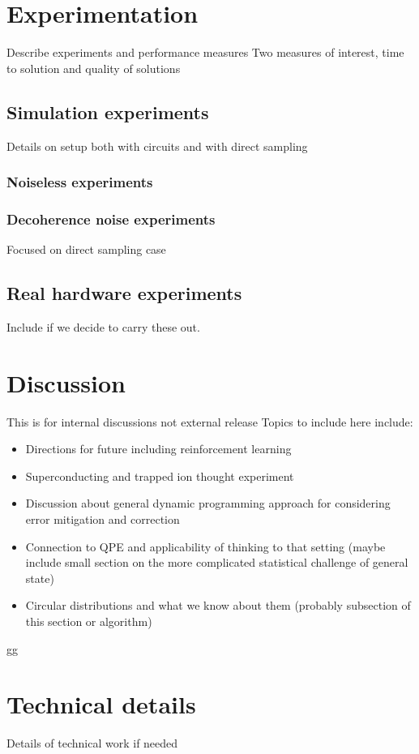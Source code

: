\documentclass[a4paper,onecolumn,11pt,unpublished]{quantumarticle}
\begin{document}
\section{Experimentation}
Describe experiments and performance measures
Two measures of interest, time to solution and quality of solutions

\subsection{Simulation experiments}
Details on setup both with circuits and with direct sampling
\subsubsection{Noiseless experiments}
	
\subsubsection{Decoherence noise experiments}
Focused on direct sampling case

\subsection{Real hardware experiments}
Include if we decide to carry these out. 
	

\section{Discussion}
This is for internal discussions not external release
Topics to include here include:
\begin{itemize}
	\item Directions for future including reinforcement learning
	\item Superconducting and trapped ion thought experiment
	\item Discussion about general dynamic programming approach for considering error mitigation and correction
	\item Connection to QPE and applicability of thinking to that setting (maybe include small section on the more complicated statistical challenge of general state)
	\item Circular distributions and what we know about them (probably subsection of this section or algorithm)
\end{itemize}



\begin{thebibliography}{9}


gg
\end{thebibliography}




\appendix

\section{Technical details}
Details of technical work if needed
\end{document}
